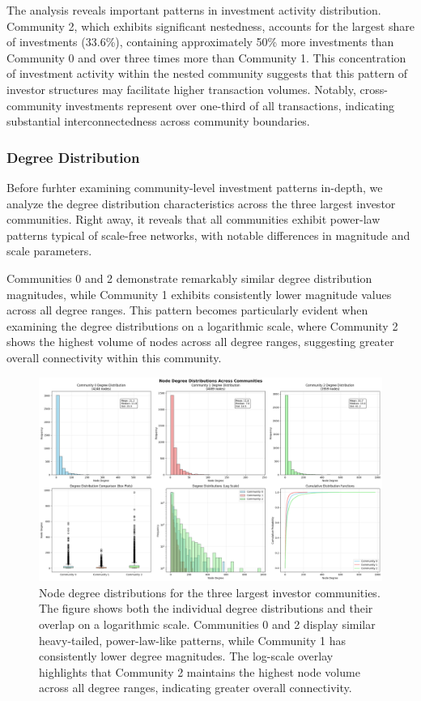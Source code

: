 The analysis reveals important patterns in investment activity distribution. Community 2, which exhibits significant nestedness, accounts for the largest share of investments (33.6\%), containing approximately 50\% more investments than Community 0 and over three times more than Community 1. This concentration of investment activity within the nested community suggests that this pattern of investor structures may facilitate higher transaction volumes. Notably, cross-community investments represent over one-third of all transactions, indicating substantial interconnectedness across community boundaries.

\subsubsection{Degree Distribution}

Before furhter examining community-level investment patterns in-depth, we analyze the degree distribution characteristics across the three largest investor communities. Right away, it reveals that all communities exhibit power-law patterns typical of scale-free networks, with notable differences in magnitude and scale parameters.

Communities 0 and 2 demonstrate remarkably similar degree distribution magnitudes, while Community 1 exhibits consistently lower magnitude values across all degree ranges. This pattern becomes particularly evident when examining the degree distributions on a logarithmic scale, where Community 2 shows the highest volume of nodes across all degree ranges, suggesting greater overall connectivity within this community.


\begin{figure}[ht]
\centering
\includegraphics[width=1\textwidth]{./assets/node-degree-distributions-across-communities.png}
\caption{Node degree distributions for the three largest investor communities. The figure shows both the individual degree distributions and their overlap on a logarithmic scale. Communities 0 and 2 display similar heavy-tailed, power-law-like patterns, while Community 1 has consistently lower degree magnitudes. The log-scale overlay highlights that Community 2 maintains the highest node volume across all degree ranges, indicating greater overall connectivity.}
\label{fig:node_degree_distributions}
\end{figure}

